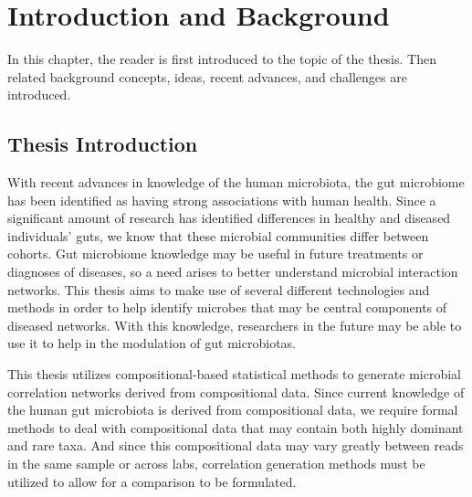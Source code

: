
\chapter{Introduction and Background}
\bigskip

In this chapter, the reader is first introduced to the topic of the thesis. Then related background concepts, ideas, recent advances, and challenges are introduced.


\section{Thesis Introduction}\label{intro-overall}

With recent advances in knowledge of the human microbiota, the gut microbiome has been identified as having strong associations with human health. Since a significant amount of research has identified differences in healthy and diseased individuals' guts, we know that these microbial communities differ between cohorts. Gut microbiome knowledge may be useful in future treatments or diagnoses of diseases, so a need arises to better understand microbial interaction networks. This thesis aims to make use of several different technologies and methods in order to help identify microbes that may be central components of diseased networks. With this knowledge, researchers in the future may be able to use it to help in the modulation of gut microbiotas.

This thesis utilizes compositional-based statistical methods to generate microbial correlation networks derived from compositional data. Since current knowledge of the human gut microbiota is derived from compositional data, we require formal methods to deal with compositional data that may contain both highly dominant and rare taxa. And since this compositional data may vary greatly between reads in the same sample or across labs, correlation generation methods must be utilized to allow for a comparison to be formulated. 

